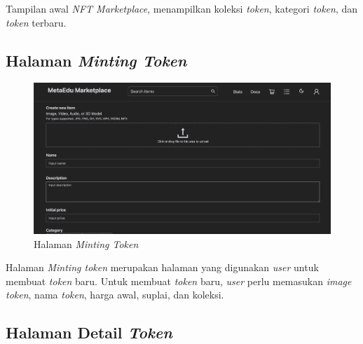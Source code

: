 Tampilan awal \emph{NFT Marketplace}, menampilkan koleksi \emph{token}, kategori \emph{token}, dan \emph{token} terbaru.

\subsection{Halaman \emph{Minting Token}}

\begin{figure} [H] \centering
  \includegraphics[scale=0.3]{gambar/img-frontend-add-token.png}
  \caption{Halaman \emph{Minting Token}}
  \label{fig:TokenMinting}
\end{figure}

Halaman \emph{Minting token} merupakan halaman yang digunakan \emph{user} untuk membuat \emph{token} baru. Untuk membuat \emph{token} baru, \emph{user} perlu memasukan \emph{image} \emph{token}, nama \emph{token}, harga awal, suplai, dan koleksi. 

\subsection{Halaman Detail \emph{Token}}

